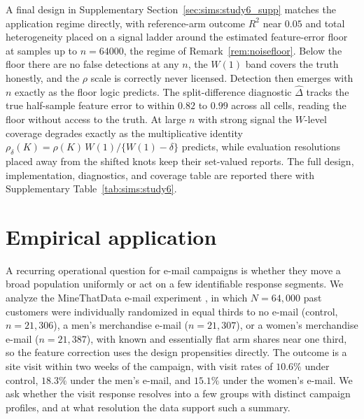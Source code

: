\documentclass[11pt]{article}
\begin{document}
A final design in Supplementary Section~\ref{sec:sims:study6_supp} matches the application regime directly, with reference-arm outcome $R^2$ near $0.05$ and total heterogeneity placed on a signal ladder around the estimated feature-error floor at samples up to $n=64000$, the regime of Remark~\ref{rem:noisefloor}. Below the floor there are no false detections at any $n$, the $W(1)$ band covers the truth honestly, and the $\rho$ scale is correctly never licensed. Detection then emerges with $n$ exactly as the floor logic predicts. The split-difference diagnostic $\widehat\Delta$ tracks the true half-sample feature error to within $0.82$ to $0.99$ across all cells, reading the floor without access to the truth. At large $n$ with strong signal the $W$-level coverage degrades exactly as the multiplicative identity $\rho_\delta(K)=\rho(K)\,W(1)/\{W(1)-\delta\}$ predicts, while evaluation resolutions placed away from the shifted knots keep their set-valued reports. The full design, implementation, diagnostics, and coverage table are reported there with Supplementary Table~\ref{tab:sims:study6}.


\section{Empirical application}\label{sec:application}

A recurring operational question for e-mail campaigns is whether they move a broad population uniformly or act on a few identifiable response segments. We analyze the MineThatData e-mail experiment \citep{hillstrom2008}, in which $N=64{,}000$ past customers were individually randomized in equal thirds to no e-mail (control, $n=21{,}306$), a men's merchandise e-mail ($n=21{,}307$), or a women's merchandise e-mail ($n=21{,}387$), with known and essentially flat arm shares near one third, so the feature correction uses the design propensities directly. The outcome is a site visit within two weeks of the campaign, with visit rates of $10.6\%$ under control, $18.3\%$ under the men's e-mail, and $15.1\%$ under the women's e-mail. We ask whether the visit response resolves into a few groups with distinct campaign profiles, and at what resolution the data support such a summary.
\end{document}
